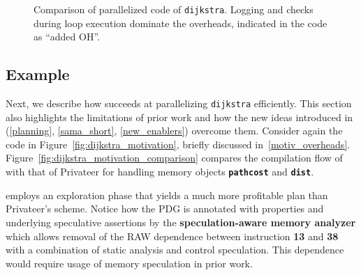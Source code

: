 \begin{figure}[!h]
\centering
\scriptsize
{}
\caption{Comparison of parallelized code of \texttt{dijkstra}. Logging and
checks during loop execution dominate the overheads, indicated in the code
as ``added OH''.}
\label{fig:dijkstra_motivation_comparison_source_code}
\end{figure}


\subsection{Example}
\label{motiv_example}

Next, we describe how \name succeeds at parallelizing \texttt{dijkstra}
efficiently. This section also highlights the limitations of prior
work and how the new ideas introduced in \name
(\cref{planning}, \cref{sama_short}, \cref{new_enablers}) overcome them.
%
Consider again the code in Figure~\ref{fig:dijkstra_motivation},
briefly discussed in~\cref{motiv_overheads}.
%
Figure~\ref{fig:dijkstra_motivation_comparison} compares the
compilation flow of \name with that of Privateer for handling memory objects
\texttt{\textbf{pathcost}} and \texttt{\textbf{dist}}.

\name employs an exploration phase that yields a much more profitable plan
than Privateer's scheme.
Notice how the PDG is annotated with properties and underlying speculative
assertions by the \textbf{speculation-aware memory analyzer} which allows
removal of the RAW dependence between instruction \textbf{13} and
\textbf{38} with a combination of static analysis and control speculation.
This dependence would require usage of memory speculation in prior work.
%


